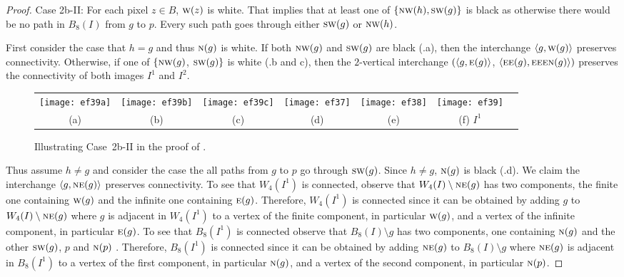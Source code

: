 \documentclass[lotsofwhite,charterfonts]{patmorin}
\newcommand{\N}{\textsc{n}}
\newcommand{\NE}{\textsc{ne}}
\newcommand{\E}{\textsc{e}}
\newcommand{\SW}{\textsc{sw}}
\newcommand{\W}{\textsc{w}}
\newcommand{\NW}{\textsc{nw}}
\newcommand{\ic}[2]{\langle #1,#2 \rangle}
\newcommand{\sm}{\ensuremath{\setminus}}
\begin{document}
\begin{proof}
\noindent Case 2b-II: For each pixel $z\in B$, $\W(z)$ is white. That implies that at least one of $\{\NW(h), \SW(g)\}$ is black as otherwise there would be no path in $B_8(I)$ from $g$ to $p$. Every such path goes through either $\SW(g)$ or $\NW(h)$.

First consider the case that  $h=g$ and thus $\N(g)$ is white. If both $\NW(g)$ and $\SW(g)$ are black (.a), then the interchange $\ic{g}{\W(g)}$ preserves connectivity. Otherwise, if one of $\{\NW(g)$, $\SW(g)\}$ is white (.b and c), then the $2$-vertical interchange $(\ic{g}{\E(g)}$, $\ic{\E\E(g)}{\E\E\E\N(g)})$ preserves the connectivity of both images $I^1$ and $I^2$.

\begin{figure}[htbp]
\begin{center}
\begin{tabular}{ccccccc}
\texttt{[image: ef39a]} &
\texttt{[image: ef39b]} &
\texttt{[image: ef39c]} &
\texttt{[image: ef37]} &
\texttt{[image: ef38]} &
\texttt{[image: ef39]}
\\
(a) & (b) & (c) & (d) & (e) & (f) $I^1$
\end{tabular}
\end{center}
\caption{Illustrating Case~2b-II in the proof of .}
\end{figure}


Thus assume $h\not=g$ and consider the case the all paths from  $g$ to $p$ go through $\SW(g)$. Since $h\not=g$, $\N(g)$ is black (.d). We claim the interchange $\ic{g}{\NE(g)}$ preserves connectivity. To see that $W_4(I^1)$ is connected, observe that $W_4(I)\sm \NE(g)$ has two components, the finite one containing $\W(g)$ and the infinite one containing $\E(g)$. Therefore, $W_4(I^1)$ is connected since it can be obtained by adding $g$ to $W_4(I)\sm \NE(g)$ where $g$ is adjacent in $W_4(I^1)$ to a vertex of the finite component, in particular $\W(g)$, and a vertex of the infinite component, in particular $\E(g)$. To see that $B_8(I^1)$ is connected observe that $B_8(I)\sm g$ has two components, one containing $\N(g)$ and the other $\SW(g)$, $p$ and $\N(p)$ . Therefore, $B_8(I^1)$ is connected since it can be obtained by adding $\NE(g)$ to $B_8(I)\sm g$ where $\NE(g)$ is adjacent in $B_8(I^1)$ to a vertex of the first component, in particular $\N(g)$, and a vertex of the second component, in particular $\N(p)$. 


\end{proof}
\end{document}

